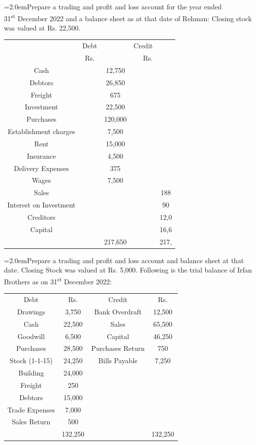 \documentclass[11pt,a4paper]{article}
\newcommand{\lqn}[2]{\Needspace{6\baselineskip}\par\medskip\noindent\hangindent=2.0em\hangafter=1\makebox[2.0em][l]{\textbf{#1.}}#2\par}
\begin{document}
\lqn{86}{Prepare a trading and profit and loss account for the year ended\\
31\textsuperscript{st} December 2022 and a balance sheet as at that date of Rehman: Closing stock was valued at Rs. 22,500.\par
\par\smallskip\noindent\hspace*{1.2em}\begin{tabular}{|cccrc|}
\hline
 & Debt &  & Credit &  \\
 & Rs. &  & Rs. &  \\
Cash &  & 12,750 &  &  \\
Debtors &  & 26,850 &  &  \\
Freight &  & 675 &  &  \\
Investment &  & 22,500 &  &  \\
Purchases &  & 120,000 &  &  \\
Establishment charges &  & 7,500 &  &  \\
Rent &  & 15,000 &  &  \\
Insurance &  & 4,500 &  &  \\
Delivery Expenses &  & 375 &  &  \\
Wages &  & 7,500 &  &  \\
Sales &  &  &  & 188 \\
Interest on Investment &  &  &  & 90 \\
Creditors &  &  &  & 12,0 \\
Capital &  &  &  & 16,6 \\
 &  & 217,650 &  & 217, \\
\hline
\end{tabular}\par\smallskip
}
\lqn{87}{Prepare a trading and profit and loss account and balance sheet at that date. Closing Stock was valued at Rs. 5,000. Following is the trial balance of Irfan Brothers as on 31\textsuperscript{st}  December 2022:\par
\par\smallskip\noindent\hspace*{1.2em}\begin{tabular}{|cccc|}
\hline
Debt & Rs. & Credit & Rs. \\
Drawings & 3,750 & Bank Overdraft & 12,500 \\
Cash & 22,500 & Sales & 65,500 \\
Goodwill & 6,500 & Capital & 46,250 \\
Purchases & 28,500 & Purchases Return & 750 \\
Stock (1-1-15) & 24,250 & Bills Payable & 7,250 \\
Building & 24,000 &  &  \\
Freight & 250 &  &  \\
Debtors & 15,000 &  &  \\
Trade Expenses & 7,000 &  &  \\
Sales Return & 500 &  &  \\
 & 132,250 &  & 132,250 \\
\hline
\end{tabular}\par\smallskip
}
\end{document}

